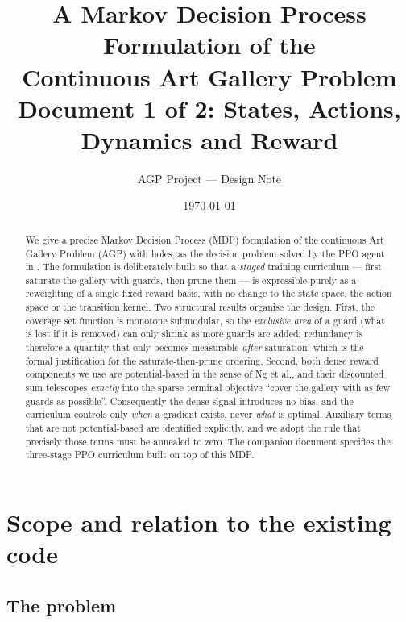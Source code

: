 \documentclass[11pt,a4paper]{article}
\title{\bfseries A Markov Decision Process Formulation of the\\ Continuous Art Gallery Problem\\[4pt]
\large Document 1 of 2: States, Actions, Dynamics and Reward}
\author{AGP Project --- Design Note}
\date{\today}
\begin{document}
\maketitle

\begin{abstract}
\noindent
We give a precise Markov Decision Process (MDP) formulation of the continuous Art Gallery
Problem (AGP) with holes, as the decision problem solved by the PPO agent in
. The formulation is deliberately built so that a
\emph{staged} training curriculum --- first saturate the gallery with guards, then prune
them --- is expressible purely as a reweighting of a single fixed reward basis, with no
change to the state space, the action space or the transition kernel. Two structural
results organise the design. First, the coverage set function is monotone submodular, so
the \emph{exclusive area} of a guard (what is lost if it is removed) can only shrink as
more guards are added; redundancy is therefore a quantity that only becomes measurable
\emph{after} saturation, which is the formal justification for the saturate-then-prune
ordering. Second, both dense reward components we use are potential-based in the sense of
Ng et al., and their discounted sum telescopes \emph{exactly} into the sparse terminal
objective ``cover the gallery with as few guards as possible''. Consequently the dense
signal introduces no bias, and the curriculum controls only \emph{when} a gradient exists,
never \emph{what} is optimal. Auxiliary terms that are not potential-based are identified
explicitly, and we adopt the rule that precisely those terms must be annealed to zero.
The companion document specifies the three-stage PPO curriculum built on top of this MDP.
\end{abstract}

\tableofcontents

\section{Scope and relation to the existing code}

\subsection{The problem}
\end{document}

